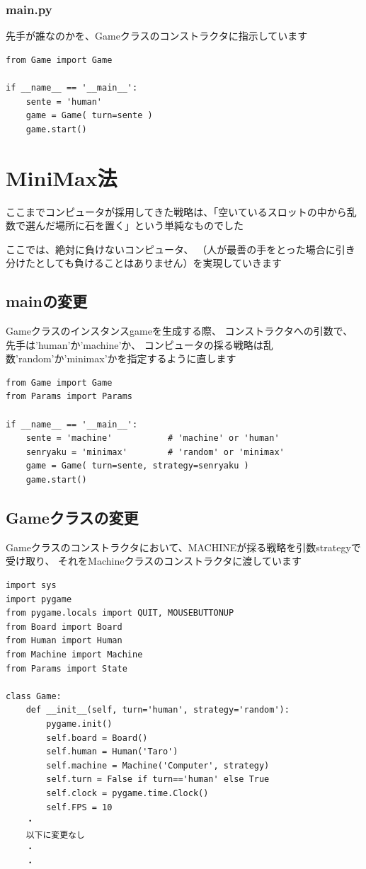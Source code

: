 \documentclass[uplatex,a4paper,11pt,oneside,openany]{jsbook}
\begin{document}
\subsubsection{main.py}

先手が誰なのかを、Gameクラスのコンストラクタに指示しています

\begin{lstlisting}[caption=main.py,label=prog05-3]
from Game import Game

if __name__ == '__main__':
    sente = 'human'
    game = Game( turn=sente )
    game.start()
\end{lstlisting}%

\section{MiniMax法}

ここまでコンピュータが採用してきた戦略は、「空いているスロットの中から乱数で選んだ場所に石を置く」という単純なものでした

ここでは、絶対に負けないコンピュータ、
（人が最善の手をとった場合に引き分けたとしても負けることはありません）を実現していきます

\subsection{mainの変更}

Gameクラスのインスタンスgameを生成する際、
コンストラクタへの引数で、先手は'human'か'machine'か、
コンピュータの採る戦略は乱数'random'か'minimax'かを指定するように直します

\begin{lstlisting}[caption=main.py,label=minimax00]
from Game import Game
from Params import Params

if __name__ == '__main__':
    sente = 'machine'           # 'machine' or 'human'
    senryaku = 'minimax'        # 'random' or 'minimax'
    game = Game( turn=sente, strategy=senryaku )
    game.start()
\end{lstlisting}

\subsection{Gameクラスの変更}

Gameクラスのコンストラクタにおいて、MACHINEが採る戦略を引数strategyで受け取り、
それをMachineクラスのコンストラクタに渡しています

\begin{lstlisting}[caption=Game.py,label=minimax02]
import sys
import pygame
from pygame.locals import QUIT, MOUSEBUTTONUP
from Board import Board
from Human import Human
from Machine import Machine
from Params import State

class Game:
    def __init__(self, turn='human', strategy='random'):
        pygame.init()
        self.board = Board()
        self.human = Human('Taro')
        self.machine = Machine('Computer', strategy)
        self.turn = False if turn=='human' else True
        self.clock = pygame.time.Clock()
        self.FPS = 10
    ・
    以下に変更なし
    ・
    ・
\end{lstlisting}
\end{document}
